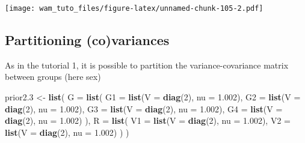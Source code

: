 \documentclass[
  12pt,
]{book}
\newenvironment{Shaded}{\begin{snugshade}}{\end{snugshade}}
\newcommand{\DataTypeTok}[1]{\textcolor[rgb]{0.13,0.29,0.53}{#1}}
\newcommand{\DecValTok}[1]{\textcolor[rgb]{0.00,0.00,0.81}{#1}}
\newcommand{\FloatTok}[1]{\textcolor[rgb]{0.00,0.00,0.81}{#1}}
\newcommand{\KeywordTok}[1]{\textcolor[rgb]{0.13,0.29,0.53}{\textbf{#1}}}
\newcommand{\NormalTok}[1]{#1}
\newcommand{\StringTok}[1]{\textcolor[rgb]{0.31,0.60,0.02}{#1}}
\begin{document}
\texttt{[image: wam\_tuto\_files/figure-latex/unnamed-chunk-105-2.pdf]}

\hypertarget{partitioning-covariances}{%
\subsection{Partitioning (co)variances}\label{partitioning-covariances}}

As in the tutorial 1, it is possible to partition the variance-covariance matrix between groups (here sex)

\begin{Shaded}
\begin{Highlighting}[]
\NormalTok{prior2}\FloatTok{.3}\NormalTok{ \textless{}{-}}\StringTok{ }\KeywordTok{list}\NormalTok{(}
  \DataTypeTok{G =} \KeywordTok{list}\NormalTok{(}
    \DataTypeTok{G1 =} \KeywordTok{list}\NormalTok{(}\DataTypeTok{V =} \KeywordTok{diag}\NormalTok{(}\DecValTok{2}\NormalTok{), }\DataTypeTok{nu =} \FloatTok{1.002}\NormalTok{),}
    \DataTypeTok{G2 =} \KeywordTok{list}\NormalTok{(}\DataTypeTok{V =} \KeywordTok{diag}\NormalTok{(}\DecValTok{2}\NormalTok{), }\DataTypeTok{nu =} \FloatTok{1.002}\NormalTok{),}
    \DataTypeTok{G3 =} \KeywordTok{list}\NormalTok{(}\DataTypeTok{V =} \KeywordTok{diag}\NormalTok{(}\DecValTok{2}\NormalTok{), }\DataTypeTok{nu =} \FloatTok{1.002}\NormalTok{),}
    \DataTypeTok{G4 =} \KeywordTok{list}\NormalTok{(}\DataTypeTok{V =} \KeywordTok{diag}\NormalTok{(}\DecValTok{2}\NormalTok{), }\DataTypeTok{nu =} \FloatTok{1.002}\NormalTok{)}
\NormalTok{  ),}
  \DataTypeTok{R =} \KeywordTok{list}\NormalTok{(}
    \DataTypeTok{V1 =} \KeywordTok{list}\NormalTok{(}\DataTypeTok{V =} \KeywordTok{diag}\NormalTok{(}\DecValTok{2}\NormalTok{), }\DataTypeTok{nu =} \FloatTok{1.002}\NormalTok{),}
    \DataTypeTok{V2 =} \KeywordTok{list}\NormalTok{(}\DataTypeTok{V =} \KeywordTok{diag}\NormalTok{(}\DecValTok{2}\NormalTok{), }\DataTypeTok{nu =} \FloatTok{1.002}\NormalTok{)}
\NormalTok{  )}
\NormalTok{)}


\end{Highlighting}
\end{Shaded}
\end{document}
